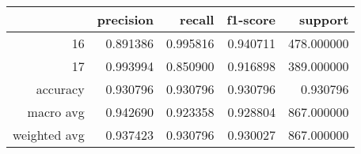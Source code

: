 \begin{table}[h]
\centering
\label{table:5}
\begin{tabular}{rrrrr}
\toprule
 & precision & recall & f1-score & support \\
\midrule
16 & 0.891386 & 0.995816 & 0.940711 & 478.000000 \\
17 & 0.993994 & 0.850900 & 0.916898 & 389.000000 \\
accuracy & 0.930796 & 0.930796 & 0.930796 & 0.930796 \\
macro avg & 0.942690 & 0.923358 & 0.928804 & 867.000000 \\
weighted avg & 0.937423 & 0.930796 & 0.930027 & 867.000000 \\
\bottomrule
\end{tabular}
\end{table}
